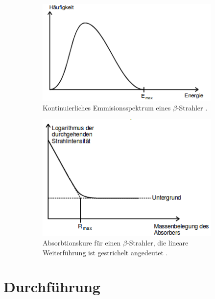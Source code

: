 \begin{figure}
  \centering
  \begin{subfigure}{0.4\textwidth}
    \centering
      \includegraphics[width=\textwidth]{betaspektrum.png}
      \caption{Kontinuierliches Emmisionsspektrum eines $\beta$-Strahler \cite{anleitung}.}
      \label{abb:2}
  \end{subfigure}
  \begin{subfigure}{0.4\textwidth}
    \centering
      \includegraphics[width=\textwidth]{betafit.png}
      \caption{Absorbtionskure für einen $\beta$-Strahler, die lineare Weiterführung
      ist gestrichelt angedeutet \cite{anleitung}.}
      \label{abb:3}
  \end{subfigure}
  \caption{}
\end{figure}
\section{Durchführung}
